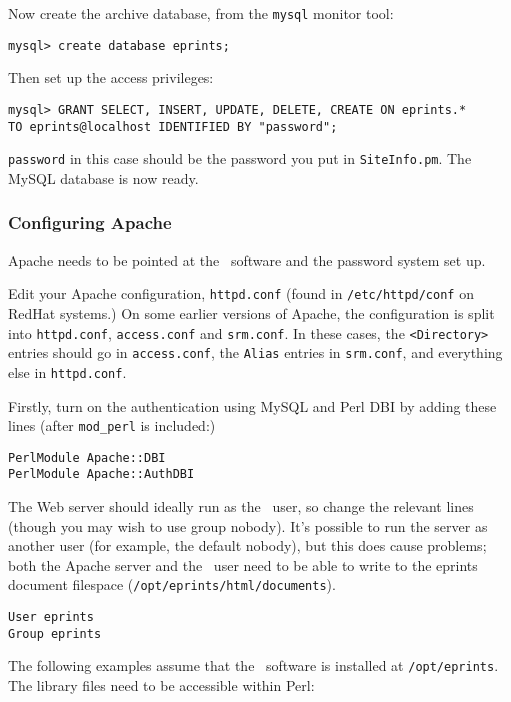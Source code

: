 Now create the archive database, from the {\tt mysql} monitor tool:

\begin{verbatim}
mysql> create database eprints;
\end{verbatim}

Then set up the access privileges:

\begin{verbatim}
mysql> GRANT SELECT, INSERT, UPDATE, DELETE, CREATE ON eprints.*
TO eprints@localhost IDENTIFIED BY "password";
\end{verbatim}

{\tt password} in this case should be the password you put in {\tt SiteInfo.pm}. The MySQL database is now ready.


\subsubsection{Configuring Apache}
\label{manual_apache}

Apache needs to be pointed at the \eprints\ software and the password system set up.

Edit your Apache configuration, {\tt httpd.conf} (found in {\tt /etc/httpd/conf} on RedHat systems.) On some earlier versions of Apache, the configuration is split into {\tt httpd.conf}, {\tt access.conf} and {\tt srm.conf}.  In these cases, the {\tt <Directory>} entries should go in {\tt access.conf}, the {\tt Alias} entries in {\tt srm.conf}, and everything else in {\tt httpd.conf}.

Firstly, turn on the authentication using MySQL and Perl DBI by adding these lines (after {\tt mod\_perl} is included:)

\begin{verbatim}
PerlModule Apache::DBI
PerlModule Apache::AuthDBI
\end{verbatim}

The Web server should ideally run as the \eprints\ user, so change the relevant lines (though you may wish to use group nobody). It's possible to run the server as another user (for example, the default nobody), but this does cause problems; both the Apache server and the \eprints\ user need to be able to write to the eprints document filespace ({\tt /opt/eprints/html/documents}).

\begin{verbatim}
User eprints
Group eprints
\end{verbatim}

The following examples assume that the \eprints\ software is installed at {\tt /opt/eprints}. The library files need to be accessible within Perl:

